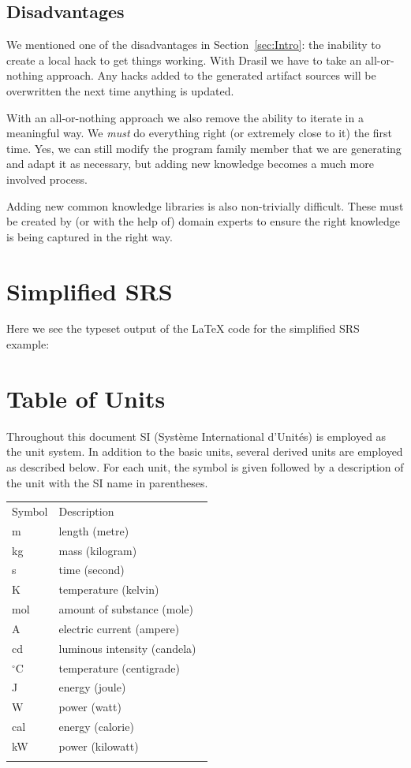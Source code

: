 \documentclass[preprint, 10pt]{sigplanconf}
\begin{document}
\subsection{Disadvantages}
\label{subsec:disadvantages}

We mentioned one of the disadvantages in Section~\ref{sec:Intro}: the inability
to create a local hack to get things working. With Drasil we have to take an
all-or-nothing approach. Any hacks added to the generated artifact sources will
be overwritten the next time anything is updated.

With an all-or-nothing approach we also remove the ability to iterate in a
meaningful way. We \emph{must} do everything right (or extremely close to it)
the first time. Yes, we can still modify the program family member that we are
generating and adapt it as necessary, but adding new knowledge becomes a much
more involved process.

Adding new common knowledge libraries is also non-trivially difficult. These
must be created by (or with the help of) domain experts to ensure the right
knowledge is being captured in the right way.

\clearpage
\onecolumn
\appendix
\section{Simplified SRS}
\label{appendix:SRS}
Here we see the typeset output of the LaTeX code for the simplified SRS example:

\section*{Table of Units}
\label{Sec:ToU}
Throughout this document SI (Syst\`{e}me International
d'Unit\'{e}s) is employed as the unit system. In addition to
the basic units, several derived units are employed as
described below. For each unit, the symbol is given followed
by a description of the unit with the SI name in
parentheses.
\begin{longtable}{l p{8.5cm}}
Symbol & Description\
\\
m & length (metre)\
\\
kg & mass (kilogram)\
\\
s & time (second)\
\\
K & temperature (kelvin)\
\\
mol & amount of substance (mole)\
\\
A & electric current (ampere)\
\\
cd & luminous intensity (candela)\
\\
${}^{\circ}$C & temperature (centigrade)\
\\
J & energy (joule)\
\\
W & power (watt)\
\\
cal & energy (calorie)\
\\
kW & power (kilowatt)\
\\
\label{Table:ToU}
\end{longtable}
\end{document}
